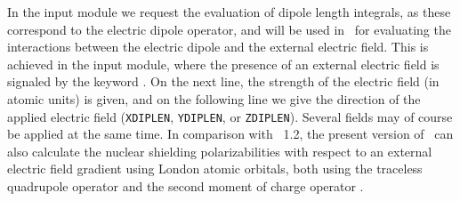 In the  input module we request the evaluation of dipole
length integrals, as these correspond to
the electric dipole operator, 
and will be used in \sir\ for evaluating the interactions between the
electric dipole and the external electric field. This is achieved in
the  input module, where the presence of an external
electric field is signaled by the
keyword . On the next line, the
strength of the electric field (in atomic units) is given, and on the following
line we give the direction of the applied electric field
(\verb|XDIPLEN|, \verb|YDIPLEN|, or \verb|ZDIPLEN|). Several fields may
of course be applied at the same time. In comparison with \dalton\
1.2, the present version of \dalton\ can also calculate the nuclear
shielding polarizabilities with respect to an external electric field
gradient using London atomic orbitals, both using the traceless
quadrupole operator  and the second moment of charge
operator .
